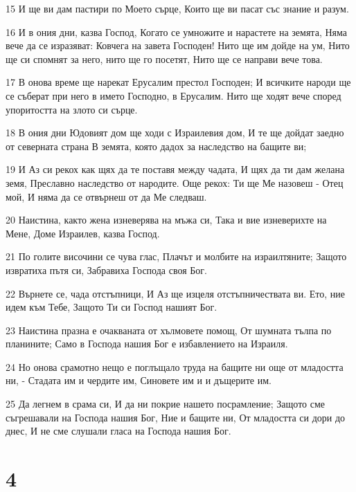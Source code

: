 \par 15 И ще ви дам пастири по Моето сърце, Които ще ви пасат със знание и разум.
\par 16 И в ония дни, казва Господ, Когато се умножите и нарастете на земята, Няма вече да се изразяват: Ковчега на завета Господен! Нито ще им дойде на ум, Нито ще си спомнят за него, нито ще го посетят, Нито ще се направи вече това.
\par 17 В онова време ще нарекат Ерусалим престол Господен; И всичките народи ще се съберат при него в името Господно, в Ерусалим. Нито ще ходят вече според упоритостта на злото си сърце.
\par 18 В ония дни Юдовият дом ще ходи с Израилевия дом, И те ще дойдат заедно от северната страна В земята, която дадох за наследство на бащите ви;
\par 19 И Аз си рекох как щях да те поставя между чадата, И щях да ти дам желана земя, Преславно наследство от народите. Още рекох: Ти ще Ме назовеш - Отец мой, И няма да се отвърнеш от да Ме следваш.
\par 20 Наистина, както жена изневерява на мъжа си, Така и вие изневерихте на Мене, Доме Израилев, казва Господ.
\par 21 По голите височини се чува глас, Плачът и молбите на израилтяните; Защото извратиха пътя си, Забравиха Господа своя Бог.
\par 22 Върнете се, чада отстъпници, И Аз ще изцеля отстъпничествата ви. Ето, ние идем към Тебе, Защото Ти си Господ нашият Бог.
\par 23 Наистина празна е очакваната от хълмовете помощ, От шумната тълпа по планините; Само в Господа нашия Бог е избавлението на Израиля.
\par 24 Но онова срамотно нещо е поглъщало труда на бащите ни още от младостта ни, - Стадата им и чердите им, Синовете им и и дъщерите им.
\par 25 Да легнем в срама си, И да ни покрие нашето посрамление; Защото сме съгрешавали на Господа нашия Бог, Ние и бащите ни, От младостта си дори до днес, И не сме слушали гласа на Господа нашия Бог.

\chapter{4}

